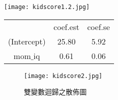\documentclass[xcolor=dvipsnames]{beamer}
\begin{document}
\begin{frame}
 \begin{minipage}{\textwidth}
 \begin{minipage}[b]{0.49\textwidth}
    \centering
     \texttt{[image: kidscore1.2.jpg]}
  \end{minipage}
  \hfill
 \begin{minipage}[b]{0.49\textwidth}
    \centering
   \begin{tabular}{|c c c|}
\hline
 & coef.est & coef.se \\

(Intercept) &  25.80   &  5.92  \\
mom$\_$iq &  0.61  &   0.06 \\
\hline
     \end{tabular}
  \end{minipage}
\end{minipage}
\end{frame}  
\begin{frame}
\begin{center}
\begin{figure}
\texttt{[image: kidscore2.jpg]}
\caption{雙變數迴歸之散佈圖}
\end{figure}
\end{center}
\end{frame}
\end{document}

